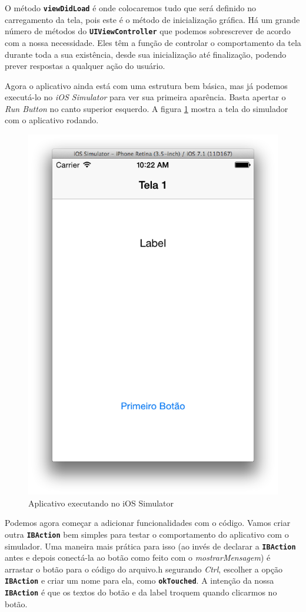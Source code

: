 \documentclass[a4paper,12pt,brazil,doubleside]{book}
\begin{document}
\begin{singlespace}
O método \texttt{\textbf{viewDidLoad}} é onde colocaremos tudo que será definido no carregamento da tela, pois este é o método de inicialização gráfica. Há um grande número de métodos do \texttt{\textbf{UIViewController}} que podemos sobrescrever de acordo com a nossa necessidade. Eles têm a função de controlar o comportamento da tela durante toda a sua existência, desde sua inicialização até finalização, podendo prever respostas a qualquer ação do usuário.

Agora o aplicativo ainda está com uma estrutura bem básica, mas já podemos executá-lo no \emph{iOS Simulator} para ver sua primeira aparência. Basta apertar o \emph{Run Button} no canto superior esquerdo. A figura \ref{fig:app_executanto1} mostra a tela do simulador com o aplicativo rodando.

\begin{figure}[H]
  \centering
  \includegraphics[width=.55\textwidth]{figuras/3/tela_novo_projeto_26.png}
  \caption{Aplicativo executando no iOS Simulator}
  \label{fig:app_executanto1}
\end{figure}

Podemos agora começar a adicionar funcionalidades com o código. Vamos criar outra \texttt{\textbf{IBAction}} bem simples para testar o comportamento do aplicativo com o simulador. Uma maneira mais prática para isso (ao invés de declarar a \texttt{\textbf{IBAction}} antes e depois conectá-la ao botão como feito com o \emph{mostrarMensagem}) é arrastar o botão para o código do arquivo.h segurando \emph{Ctrl}, escolher a opção \texttt{\textbf{IBAction}} e criar um nome para ela, como \texttt{\textbf{okTouched}}. A intenção da nossa \texttt{\textbf{IBAction}} é que os textos do botão e da label troquem quando clicarmos no botão.


\end{singlespace}
\end{document}
